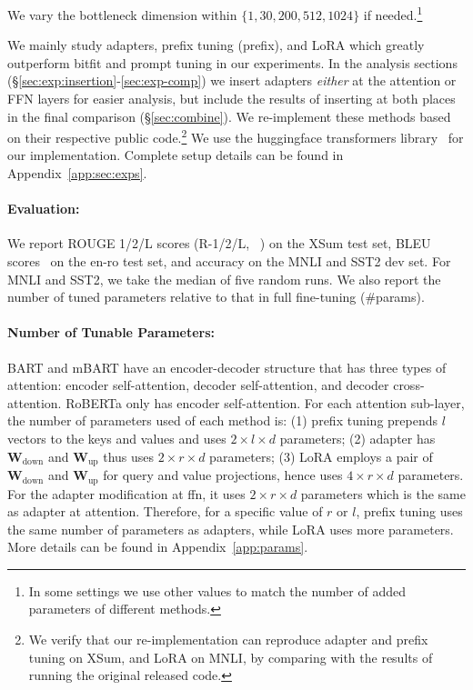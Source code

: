 We vary the bottleneck dimension within $\{1, 30, 200, 512, 1024\}$ if needed.\footnote{

In some settings we use other values to match the number of added parameters of different methods.}

We mainly study adapters, prefix tuning (prefix), and LoRA which greatly outperform bitfit and prompt tuning in our experiments. In the analysis sections (\S\ref{sec:exp:insertion}-\ref{sec:exp-comp}) we insert adapters \emph{either} at the attention or FFN layers for easier analysis, but include the results of inserting at both places in the final comparison (\S\ref{sec:combine}).  
We re-implement these methods based on their respective public code.\footnote{

We verify that our re-implementation can reproduce adapter and prefix tuning on XSum, and LoRA on MNLI, by comparing with the results of running the original released code.} We use the huggingface transformers library~\citep{wolf-etal-2020-transformers} for our implementation. Complete setup details can be found in Appendix~\ref{app:sec:exps}. 
\paragraph{Evaluation:}
We report ROUGE 1/2/L scores (R-1/2/L, ~\citet{lin-2004-rouge}) on the XSum test set, BLEU scores~\citep{papineni-etal-2002-bleu} on the en-ro test set, and accuracy on the MNLI and SST2 dev set. For MNLI and SST2, we take the median of five random runs. We also report the number of tuned parameters relative to that in full fine-tuning (\#params). 

\paragraph{Number of Tunable Parameters:}

BART and mBART have an encoder-decoder structure that has three types of attention: encoder self-attention, decoder self-attention, and decoder cross-attention. RoBERTa only has encoder self-attention. For each attention sub-layer, the number of parameters used of each method is: (1) prefix tuning prepends $l$ vectors to the keys and values and uses $2 \times l \times d$ parameters; (2) adapter has ${\bm{W}}_{\text{down}}$ and ${\bm{W}}_{\text{up}}$ thus uses $2 \times r \times d$ parameters; (3) LoRA employs a pair of ${\bm{W}}_{\text{down}}$ and ${\bm{W}}_{\text{up}}$ for query and value projections, hence uses $4 \times r \times d$ parameters. For the adapter modification at ffn, it uses $2 \times r \times d$ parameters which is the same as adapter at attention. Therefore, for a specific value of $r$ or $l$, prefix tuning uses the same number of parameters as adapters, while LoRA uses more parameters. More details can be found in Appendix~\ref{app:params}.

